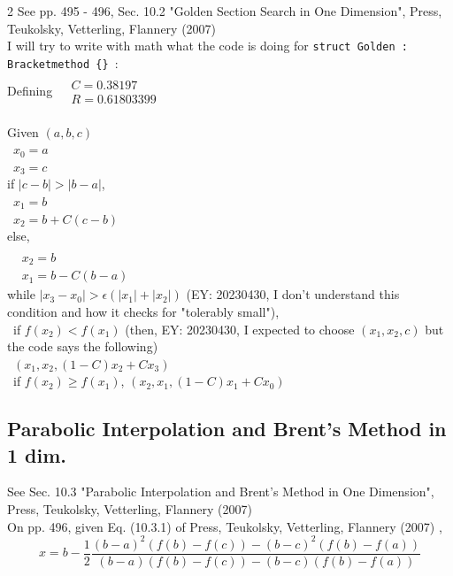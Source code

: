 \documentclass[10pt]{amsart}
\begin{document}
\begin{multicols*}{2}
See pp. 495 - 496, Sec. 10.2 "Golden Section Search in One Dimension", Press, Teukolsky, Vetterling, Flannery (2007) \cite{PTVF2007} \\

I will try to write with math what the code is doing for \verb|struct Golden : Bracketmethod {} |: \\

Defining $\begin{aligned} & \quad \\
& C = 0.38197 \\
& R = 0.61803399 \\
\end{aligned}$

Given $(a,b,c)$ \\
\quad \, $x_0 = a$ \\
\quad \, $x_3 = c$ \\
if $|c-b| > |b-a|$, \\
\quad \, $x_1 = b$ \\
\quad \, $x_2 = b + C(c-b)$ \\
else, \\
$\begin{aligned}
& \quad \, \\
& x_2 = b \\
& x_1 = b-C (b-a)
\end{aligned}$ \\

while $|x_3 - x_0| > \epsilon (|x_1| + |x_2|)$ (EY: 20230430, I don't understand this condition and how it checks for "tolerably small"), \\
\quad \, if $f(x_2) < f(x_1)$ (then, EY: 20230430, I expected to choose $(x_1, x_2, c)$ but the code says the following) \\
\quad \quad \, $(x_1,x_2, (1-C)x_2 + Cx_3)$ \\
\quad \, if $f(x_2) \geq f(x_1)$, $(x_2, x_1, (1-C)x_1 + C x_0)$ \\

\subsection{Parabolic Interpolation and Brent's Method in 1 dim.}

See Sec. 10.3 "Parabolic Interpolation and Brent's Method in One Dimension", Press, Teukolsky, Vetterling, Flannery (2007) \cite{PTVF2007} \\

On pp. 496, given Eq. (10.3.1) of Press, Teukolsky, Vetterling, Flannery (2007) \cite{PTVF2007},
\begin{equation}\label{Eq:InverseParabolicInterpolationFormulaForAbscissax}
x = b - \frac{1}{2} \frac{ (b-a)^2 (f(b) - f(c)) - (b-c)^2 (f(b) - f(a)) }{ (b-a) (f(b) -f(c)) - (b-c) (f(b) - f(a)) }
\end{equation}


\end{multicols*}
\end{document}
